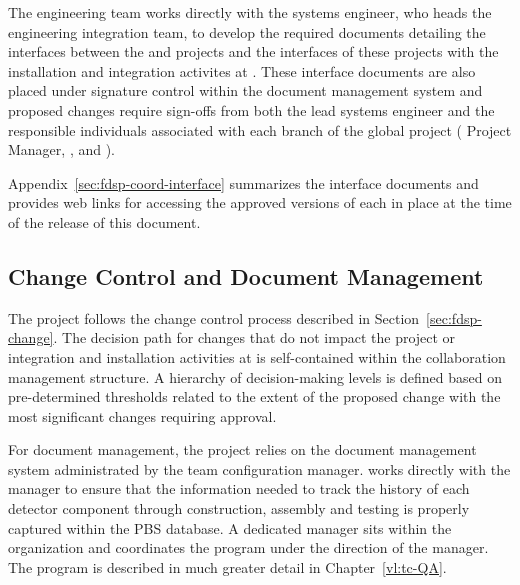 The  engineering team works directly with the
 systems engineer, who heads the  engineering
integration team, to develop the required documents detailing the
interfaces between the  and  projects and the interfaces
of these projects with the  installation and integration
activites at .  These  interface documents are
also placed under signature control within the 
document management system and proposed changes require sign-offs
from both the lead  systems engineer and the responsible
individuals associated with each branch of the global project
( Project Manager,  , and
).

Appendix~\ref{sec:fdsp-coord-interface} summarizes the interface documents
and provides web links for accessing the approved versions of each
in place at the time of the release of this document.

 
\subsection{Change Control and Document Management}

The  project follows the  change control process
described in Section~\ref{sec:fdsp-change}.  The decision path for
changes that do not impact the  project or 
integration and installation activities at  is
self-contained within the  collaboration management
structure.  A hierarchy of decision-making levels is defined based
on pre-determined thresholds related to the extent of the proposed
change with the most significant changes requiring 
 approval.

For document management, the  project relies on the 
document management system administrated by the 
team configuration manager.   works directly with the 
 manager to ensure that the information needed to track the history
of each detector component through construction, assembly and testing
is properly captured within the PBS database.  A dedicated 
 manager sits within the  organization and coordinates the
  program under the direction of the
  manager.  The   program
is described in much greater detail in Chapter~\ref{vl:tc-QA}.

